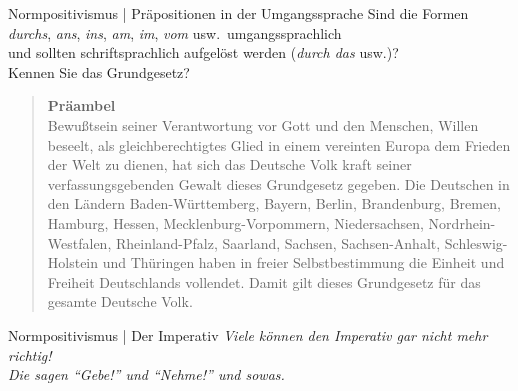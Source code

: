 \begin{frame}
  {Normpositivismus | Präpositionen in der Umgangssprache}
  \onslide<+->
  \onslide<+->
  Sind die Formen \alert{\textit{durchs}, \textit{ans}, \textit{ins}, \textit{am}, \textit{im}, \textit{vom}} usw.\ umgangssprachlich\\
   und sollten schriftsprachlich aufgelöst werden (\textit{durch das} usw.)?\\
  \Halbzeile
  \onslide<+->
  Kennen Sie das Grundgesetz?\\
  \Halbzeile
  \onslide<+->
  \begin{quote}\footnotesize
    \textbf{Präambel}\\
    
     Bewußtsein seiner Verantwortung vor Gott und den Menschen,  Willen beseelt, als gleichberechtigtes Glied in einem vereinten Europa dem Frieden der Welt zu dienen, hat sich das Deutsche Volk kraft seiner verfassungsgebenden Gewalt dieses Grundgesetz gegeben. Die Deutschen in den Ländern Baden-Württemberg, Bayern, Berlin, Brandenburg, Bremen, Hamburg, Hessen, Mecklenburg-Vorpommern, Niedersachsen, Nordrhein-Westfalen, Rheinland-Pfalz, Saarland, Sachsen, Sachsen-Anhalt, Schleswig-Holstein und Thüringen haben in freier Selbstbestimmung die Einheit und Freiheit Deutschlands vollendet. Damit gilt dieses Grundgesetz für das gesamte Deutsche Volk.
  \end{quote}
  \onslide<+->
  \Halbzeile
  \centering 
\end{frame}

\begin{frame}
  {Normpositivismus | Der Imperativ}
  \onslide<+->
  \onslide<+->
  \centering 
  \textit{Viele können den Imperativ gar nicht mehr richtig!}\\
  \Zeile
  \onslide<+->
  \alert{\LARGE\textit{Die sagen "`Gebe!"' und "`Nehme!"' und sowas.}\\}
  \onslide<+->
  \Zeile
  \\
  \onslide<+->
  \Halbzeile
\end{frame}

